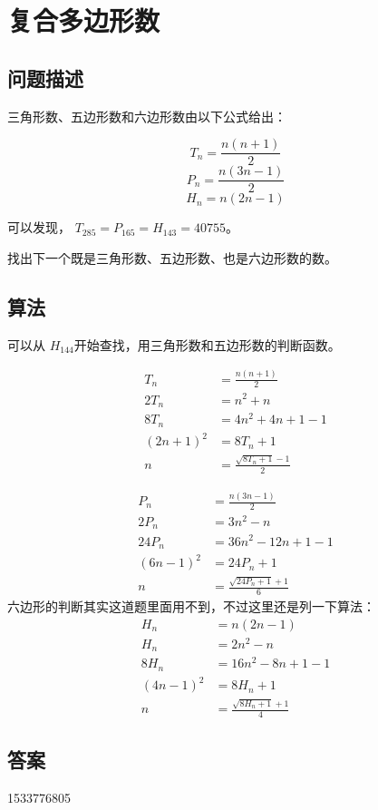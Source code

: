 \section{复合多边形数}
\subsection{问题描述}
\begin{tcolorbox}
	三角形数、五边形数和六边形数由以下公式给出：

	\[
		T_n = \frac{n(n + 1)}{2}
	\]
	\[
		P_n = \frac{n(3n - 1)}{2}
	\]
	\[
		H_n = n(2n - 1)
	\]

	可以发现， $ T_{285} = P_{165} = H_{143} =40755 $。

	找出下一个既是三角形数、五边形数、也是六边形数的数。

\end{tcolorbox}

\subsection{算法}
可以从 $ H_{144}$开始查找，用三角形数和五边形数的判断函数。

\begin{align*}
	T_n        & = \frac{n(n+1)}{2}                      \\
	2T_n       & = n^2 + n                               \\
	8T_n       & = 4n^2 + 4n + 1 - 1                     \\
	(2n + 1)^2 & = 8T_n + 1                              \\
	n          & = \frac{\sqrt{8T_n + 1} - 1}{2} \tag{1}
\end{align*}

\begin{align*}
	P_n        & = \frac{n(3n - 1)}{2}                    \\
	2P_n       & = 3n^2 - n                               \\
	24P_n      & = 36n^2 - 12n + 1 - 1                    \\
	(6n - 1)^2 & = 24P_n + 1                              \\
	n          & = \frac{\sqrt{24P_n + 1} + 1}{6} \tag{2}
\end{align*}
六边形的判断其实这道题里面用不到，不过这里还是列一下算法：
\begin{align*}
	H_n        & = n(2n - 1)                             \\
	H_n        & = 2n^2 - n                              \\
	8H_n       & = 16n^2 - 8n + 1 - 1                    \\
	(4n - 1)^2 & = 8H_n + 1                              \\
	n          & = \frac{\sqrt{8H_n + 1} + 1}{4} \tag{3}
\end{align*}
\subsection{答案}
1533776805
